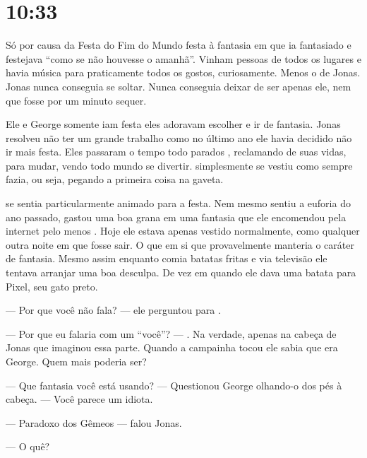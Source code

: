 \chapter{10:33}

Só  por causa da Festa do Fim do Mundo festa à fantasia em que  ia fantasiado e festejava ``como se não houvesse o amanhã''. Vinham pessoas de todos os lugares e havia música para praticamente todos os gostos, curiosamente. Menos o de Jonas. Jonas nunca conseguia se soltar. Nunca conseguia deixar de ser apenas ele, nem que fosse por um minuto sequer.

Ele e George somente iam  festa  eles adoravam escolher e ir de fantasia.  Jonas resolveu não ter um grande trabalho como  no último ano ele havia decidido não ir mais  festa. Eles passaram o tempo todo parados , reclamando de suas vidas,  para mudar, vendo todo mundo se divertir.  simplesmente se vestiu como sempre fazia, ou seja, pegando a primeira coisa na gaveta.

 se sentia particularmente animado para a festa. Nem mesmo sentiu a euforia do ano passado,  gastou uma boa grana em uma fantasia que ele encomendou pela internet pelo menos . Hoje ele estava apenas vestido normalmente, como qualquer outra noite em que fosse sair. O que em si  que provavelmente manteria o caráter de fantasia. Mesmo assim\mudanca{,} enquanto comia batatas fritas e via televisão\mudanca{,} ele tentava arranjar uma boa desculpa. De vez em quando ele dava uma batata para Pixel, seu gato preto.

--- Por que você não fala? --- ele perguntou para .

--- Por que eu falaria com um ``você''? --- . Na verdade, apenas na cabeça de Jonas\mudanca{,} que imaginou essa parte. Quando a campainha tocou\mudanca{,} ele sabia que era George. Quem mais poderia ser?

--- Que fantasia você está usando? --- Questionou George olhando-o dos pés à cabeça. --- Você parece um idiota.

--- Paradoxo dos Gêmeos --- falou Jonas.

--- O quê?


